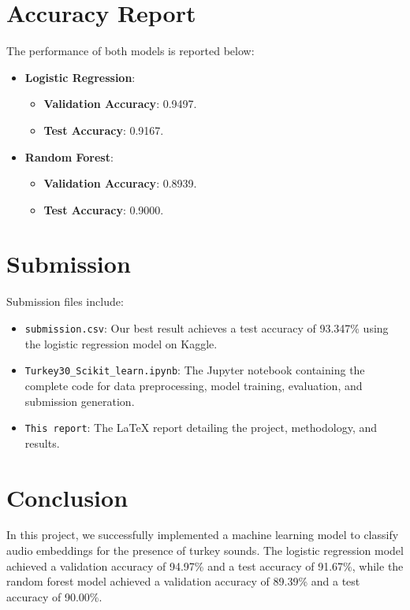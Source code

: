 \documentclass[12pt, a4paper]{article}
\begin{document}
\section{Accuracy Report}
The performance of both models is reported below:

\begin{itemize}
    \item \textbf{Logistic Regression}:
        \begin{itemize}
            \item \textbf{Validation Accuracy}: 0.9497.
            \item \textbf{Test Accuracy}: 0.9167.
        \end{itemize}
    \item \textbf{Random Forest}:
        \begin{itemize}
            \item \textbf{Validation Accuracy}: 0.8939.
            \item \textbf{Test Accuracy}: 0.9000.
        \end{itemize}
\end{itemize}

\section{Submission}
Submission files include:
\begin{itemize}
    \item \texttt{submission.csv}: Our best result achieves a test accuracy of 93.347\% using the logistic regression model on Kaggle.
    \item \texttt{Turkey30\_Scikit\_learn.ipynb}: The Jupyter notebook containing the complete code for data preprocessing, model training, evaluation, and submission generation.
    \item \texttt{This report}: The LaTeX report detailing the project, methodology, and results.
\end{itemize}

\section{Conclusion}

\indent In this project, we successfully implemented a machine learning model to classify audio embeddings for the presence of turkey sounds. The logistic regression model achieved a validation accuracy of 94.97\% and a test accuracy of 91.67\%, while the random forest model achieved a validation accuracy of 89.39\% and a test accuracy of 90.00\%.
\end{document}
